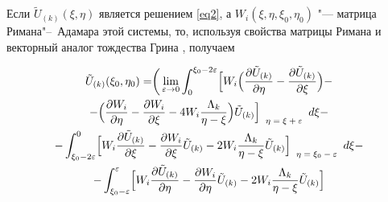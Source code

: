  Если $\tilde{U}_{(k)}(\xi,\eta)$ является решением \eqref{eq2}, а $W_i(\xi,\eta,\xi_0,\eta_0)$ "--- матрица Римана"--~Адамара этой системы, то, используя свойства матрицы Римана и векторный аналог тождества Грина \cite{bic}, получаем

\begin{multline}

 \tilde{U}_{(k)}(\xi_0,\eta_0) = \biggr( \lim\limits_{\varepsilon \to 0}  \int _0^{\xi_0-2 \varepsilon}

 \Bigr[W_i \Bigl(

\frac{\partial \tilde{U}_{(k)}}{\partial \eta}-\frac{\partial \tilde{U}_{(k)}}{\partial \xi}\Bigr) - \\

-

\Bigl(\frac{\partial W_i}{\partial \eta}-\frac{\partial W_i}{\partial \xi} - 4 W_i \frac{\Lambda_k}{\eta-\xi}\Bigr)\tilde{U}_{(k)}

\Bigr]

_{\scriptsize{

\begin{array}{l}

\eta=\xi+\varepsilon

 \end{array} }}

 d \xi -\\-

 \int _{\xi_0-2 \varepsilon}^{0}

 \Bigl[

W_i \frac{\partial \tilde{U}_{(k)}}{\partial \xi} - \frac{\partial W_i}{\partial \xi} \tilde{U}_{(k)} - 2 W_i \frac{\Lambda_k}{\eta-\xi} \tilde{U}_{(k)}

\Bigr]

_{\scriptsize{

\begin{array}{l}

\eta=\xi_0-\varepsilon

 \end{array} }}

  d \xi -

\\-

 \int _{\xi_0- \varepsilon}^{\varepsilon}

 \Bigl[

W_i \frac{\partial \tilde{U}_{(k)}}{\partial \eta} - \frac{\partial W_i}{\partial \eta} \tilde{U}_{(k)} - 2 W_i \frac{\Lambda_k}{\eta-\xi} \tilde{U}_{(k)}

\Bigr]


\end{multline}
